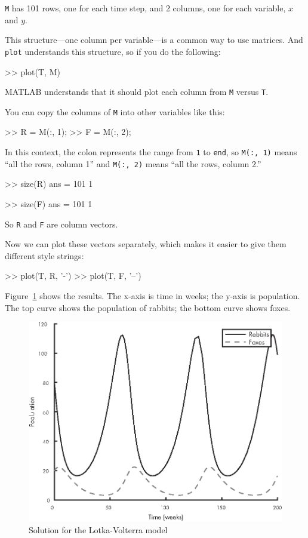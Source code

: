 \lstinline{M} has 101 rows, one for each time step, and 2 columns, one for each variable,
$x$ and $y$.

This structure---one column per variable---is a common way to
use matrices. And \lstinline{plot} understands this structure, so if you
do the following:

\begin{code}
>> plot(T, M)
\end{code}
MATLAB understands that it should plot each column from \lstinline{M}
versus \lstinline{T}.


You can copy the columns of \lstinline{M} into other variables like
this:

\begin{code}
>> R = M(:, 1);
>> F = M(:, 2);
\end{code}

In this context, the colon represents the range from \lstinline{1} to \lstinline{end},
so \lstinline{M(:, 1)} means ``all the rows, column 1'' and
\lstinline{M(:, 2)} means ``all the rows, column 2.''

\begin{code}
>> size(R)
ans = 101     1

>> size(F)
ans = 101     1
\end{code}

So \lstinline{R} and \lstinline{F} are column vectors.


Now we can plot these vectors separately, which makes it easier to give them different style strings:

\begin{code}
>> plot(T, R, '-')
>> plot(T, F, '--')
\end{code}


Figure~\ref{fig:lotka} shows the results. The x-axis is time in weeks; the y-axis is population.  The top curve shows the population of rabbits; the bottom curve shows foxes.

\begin{figure}[h]
\centerline{\includegraphics[scale=0.8]{images/figure10_01_new.eps}}
\caption{Solution for the Lotka-Volterra model}
\label{fig:lotka}
\end{figure}

